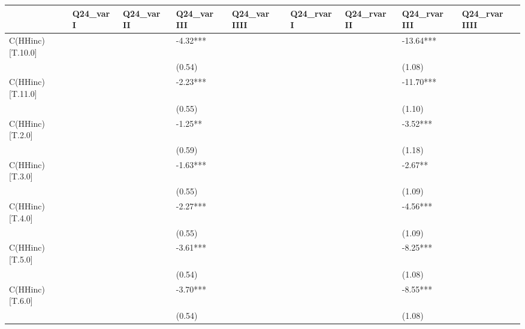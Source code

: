 \documentclass{report}
\begin{document}
\begin{table}\begin{tabular}{lllllllll}
\toprule
{} & Q24\_var I & Q24\_var II & Q24\_var III & Q24\_var IIII & Q24\_rvar I & Q24\_rvar II & Q24\_rvar III & Q24\_rvar IIII \\
\midrule
C(HHinc)[T.10.0]   &           &            &    -4.32*** &              &            &             &    -13.64*** &               \\
                   &           &            &      (0.54) &              &            &             &       (1.08) &               \\
C(HHinc)[T.11.0]   &           &            &    -2.23*** &              &            &             &    -11.70*** &               \\
                   &           &            &      (0.55) &              &            &             &       (1.10) &               \\
C(HHinc)[T.2.0]    &           &            &     -1.25** &              &            &             &     -3.52*** &               \\
                   &           &            &      (0.59) &              &            &             &       (1.18) &               \\
C(HHinc)[T.3.0]    &           &            &    -1.63*** &              &            &             &      -2.67** &               \\
                   &           &            &      (0.55) &              &            &             &       (1.09) &               \\
C(HHinc)[T.4.0]    &           &            &    -2.27*** &              &            &             &     -4.56*** &               \\
                   &           &            &      (0.55) &              &            &             &       (1.09) &               \\
C(HHinc)[T.5.0]    &           &            &    -3.61*** &              &            &             &     -8.25*** &               \\
                   &           &            &      (0.54) &              &            &             &       (1.08) &               \\
C(HHinc)[T.6.0]    &           &            &    -3.70*** &              &            &             &     -8.55*** &               \\
                   &           &            &      (0.54) &              &            &             &       (1.08) &               \\

\end{tabular}
\end{table}
\end{document}

